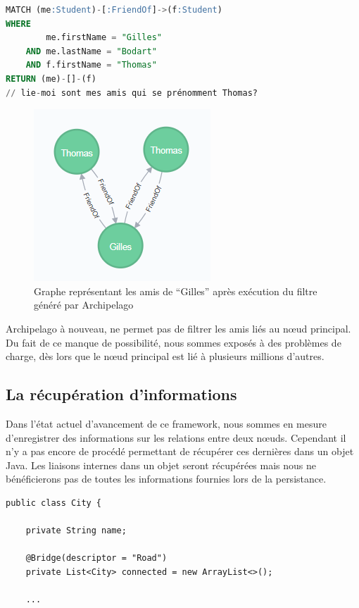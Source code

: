 \documentclass[a4paper,fleqn,12pt]{report}
\begin{document}
\begin{lstlisting}[language=SQL]
MATCH (me:Student)-[:FriendOf]->(f:Student)
WHERE
	    me.firstName = "Gilles"
	AND me.lastName = "Bodart"
	AND	f.firstName = "Thomas" 
RETURN (me)-[]-(f)
// lie-moi sont mes amis qui se prénomment Thomas?
\end{lstlisting} 

\begin{figure}[!ht]
\centering
\includegraphics[scale=1]{figures/friendOfFilt.png}
\caption{Graphe représentant les amis de \enquote{Gilles} après exécution du filtre généré par Archipelago}
\label{fig:friendOfFilt}
\end{figure}

Archipelago à nouveau, ne permet pas de filtrer les amis liés au nœud principal. Du fait de ce manque de possibilité, nous sommes exposés à des problèmes de charge, dès lors que le nœud principal est lié à plusieurs millions d'autres.

\subsection{La récupération d'informations}

Dans l'état actuel d'avancement de ce framework, nous sommes en mesure d'enregistrer des informations sur les relations entre deux nœuds. Cependant il n'y a pas encore de procédé permettant de récupérer ces dernières dans un objet Java. Les  liaisons internes dans un objet seront récupérées mais nous ne bénéficierons pas de toutes les informations fournies lors de la persistance.

\begin{lstlisting}
public class City {

    private String name;

    @Bridge(descriptor = "Road")
    private List<City> connected = new ArrayList<>();
	
	...
\end{lstlisting}
\end{document}
